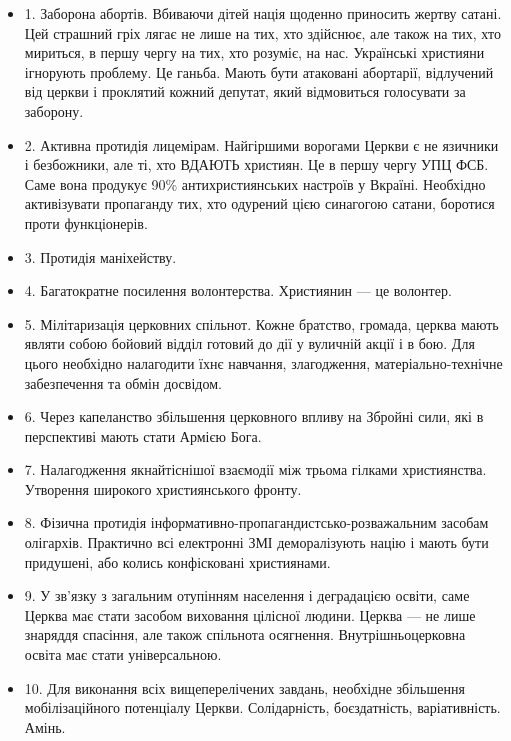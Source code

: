 \begin{itemize}
\item 1. Заборона абортів. Вбиваючи дітей нація щоденно приносить жертву
				сатані. Цей страшний гріх лягає не лише на тих, хто здійснює, але також
				на тих, хто мириться, в першу чергу на тих, хто розуміє, на нас.
				Українські християни ігнорують проблему. Це ганьба.  Мають бути
				атаковані абортарії, відлучений від церкви і проклятий кожний депутат,
				який відмовиться голосувати за заборону.

\item 2. Активна протидія лицемірам. Найгіршими ворогами Церкви є не язичники і
				безбожники, але ті, хто ВДАЮТЬ християн. Це в першу чергу УПЦ ФСБ. Саме
				вона продукує 90\% антихристиянських настроїв у Вкраїні. Необхідно
				активізувати пропаганду тих, хто одурений цією синагогою сатани,
				боротися проти функціонерів.

\item 3. Протидія маніхейству.

\item 4. Багатократне посилення волонтерства. Християнин — це волонтер.

\item 5. Мілітаризація церковних спільнот. Кожне братство, громада, церква
				мають являти собою бойовий відділ готовий до дії у вуличній акції і в
				бою. Для цього необхідно налагодити їхнє навчання, злагодження,
				матеріально-технічне забезпечення та обмін досвідом.

\item 6. Через капеланство збільшення церковного впливу на Збройні сили, які в
				перспективі мають стати Армією Бога.

\item 7. Налагодження якнайтіснішої взаємодії між трьома гілками християнства.
				Утворення широкого християнського фронту.

\item 8. Фізична протидія інформативно-пропагандистсько-розважальним засобам
				олігархів. Практично всі електронні ЗМІ деморалізують націю і мають
				бути придушені, або колись конфісковані християнами.

\item 9. У зв’язку з загальним отупінням населення і деградацією освіти, саме
				Церква має стати засобом виховання цілісної людини. Церква — не лише
				знаряддя спасіння, але також спільнота осягнення. Внутрішньоцерковна
				освіта має стати універсальною.

\item 10. Для виконання всіх вищеперелічених завдань, необхідне збільшення
				мобілізаційного потенціалу Церкви. Солідарність, боєздатність,
				варіативність. Амінь.
\end{itemize}
